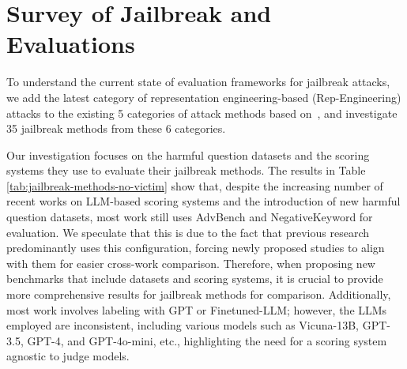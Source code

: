 \section{Survey of Jailbreak and Evaluations}
\label{app:jb_methods}

To understand the current state of evaluation frameworks for jailbreak attacks, we add the latest category of representation engineering-based (Rep-Engineering) attacks to the existing 5 categories of attack methods based on~\citet{jin2024jailbreakzoo}, and investigate 35 jailbreak methods from these 6 categories. 

Our investigation focuses on the harmful question datasets and the scoring systems they use to evaluate their jailbreak methods. The results in Table \ref{tab:jailbreak-methods-no-victim} show that, despite the increasing number of recent works on LLM-based scoring systems and the introduction of new harmful question datasets, most work still uses AdvBench and NegativeKeyword for evaluation. We speculate that this is due to the fact that previous research predominantly uses this configuration, forcing newly proposed studies to align with them for easier cross-work comparison. Therefore, when proposing new benchmarks that include datasets and scoring systems, it is crucial to provide more comprehensive results for jailbreak methods for comparison. Additionally, most work involves labeling with GPT or Finetuned-LLM; however, the LLMs employed are inconsistent, including various models such as Vicuna-13B, GPT-3.5, GPT-4, and GPT-4o-mini, etc., highlighting the need for a scoring system agnostic to judge models.

